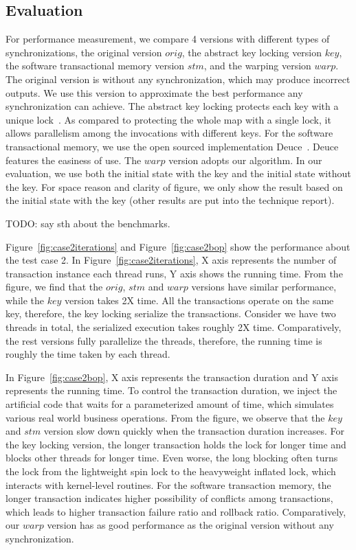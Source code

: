 \subsection{Evaluation}

For performance measurement, we compare 4 versions with different types of synchronizations, the original version $orig$, the abstract key locking version $key$, the software transactional memory version $stm$, and the warping version $warp$.  The original version is without any synchronization, which may produce incorrect outputs. 
We use this version to approximate the best performance any synchronization can achieve. The abstract key locking protects each key with a unique lock~\cite{}. As compared to protecting the whole map with a single lock, it allows parallelism among the invocations with different keys. For the software transactional memory, we use the open sourced implementation {\sf Deuce}~\cite{}. {\sf Deuce} features the easiness of use. The $warp$ version adopts our algorithm. In our evaluation, we use both the initial state with the key and the initial state without the key.  For space reason and clarity of figure, we only show the result based on the initial state with the key (other results are put into the technique report).

TODO: say sth about the benchmarks.

Figure~\ref{fig:case2iterations} and Figure~\ref{fig:case2bop} show the performance about the test case 2. In Figure~\ref{fig:case2iterations}, X axis represents the number of transaction instance each thread runs, Y axis shows the running time. From the figure, we find that the $orig$, $stm$ and $warp$ versions have similar performance, while the $key$ version takes 2X time. All the transactions operate on the same key, therefore, the key locking serialize the transactions. Consider we have two threads in total, the serialized execution takes roughly 2X time. Comparatively, the rest versions fully parallelize the threads, therefore, the running time is roughly the time taken by each thread.

In Figure~\ref{fig:case2bop}, X axis represents the transaction duration and Y axis represents the running time.  To control the transaction duration, we inject the artificial code that waits for a parameterized amount of time, which simulates various real world business operations. From the figure, we observe that the $key$ and $stm$ version slow down quickly when the transaction duration increases. For the key locking version, the longer transaction holds the lock for longer time and blocks other threads for longer time. Even worse, the long blocking often turns the lock from the lightweight spin lock to the heavyweight inflated lock, which interacts with kernel-level routines. For the software transaction memory, the longer transaction indicates higher possibility of conflicts among transactions, which leads to higher transaction failure ratio and rollback ratio. Comparatively, our $warp$ version has as good performance as the original version without any synchronization.

